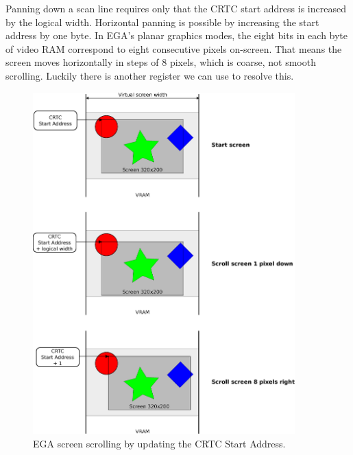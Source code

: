 \documentclass[book.tex]{subfiles}
\begin{document}
\begin{minipage}{\textwidth}
  
  \end{minipage}
  \label{ega_set_address}
  \par


\par
Panning down a scan line requires only that the CRTC start address is increased by the logical width. Horizontal panning is possible by increasing the start address by one byte. In EGA's planar graphics modes, the eight bits in each byte of video RAM correspond to eight consecutive pixels on-screen. That means the screen moves horizontally in steps of 8 pixels, which is coarse, not smooth scrolling. Luckily there is another register we can use to resolve this.\\

\begin{figure}[H]
\centering
\includegraphics[width=0.9\textwidth]{imgs/drawings/virtual_screen.eps}
\caption{EGA screen scrolling by updating the CRTC Start Address.}
\label{fig:tile_refresh}
\end{figure}
\end{document}
